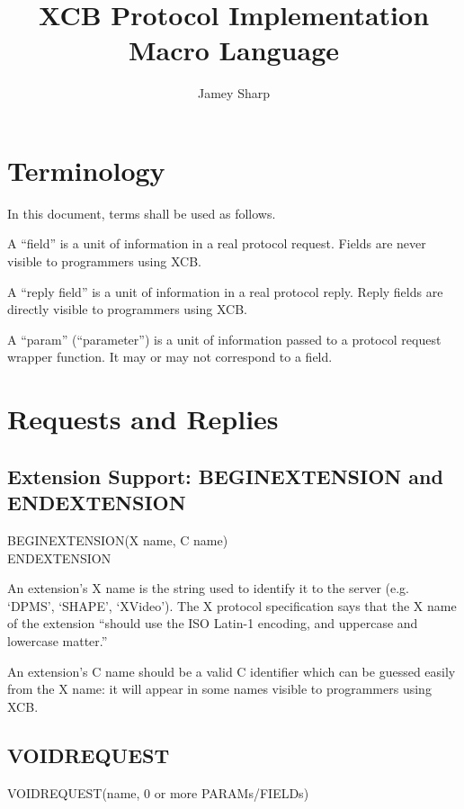 \documentclass[english]{article}
\begin{document}
\title{XCB Protocol Implementation Macro Language}


\author{Jamey Sharp}

\maketitle

\section{Terminology}

In this document, terms shall be used as follows.

A ``field'' is a unit of information in a real protocol request. Fields
are never visible to programmers using XCB.

A ``reply field'' is a unit of information in a real protocol reply.
Reply fields are directly visible to programmers using XCB.

A ``param'' (``parameter'') is a unit of information passed to a protocol
request wrapper function. It may or may not correspond to a field.


\section{Requests and Replies}


\subsection{Extension Support: BEGINEXTENSION and ENDEXTENSION}

BEGINEXTENSION(X name, C name)\\
ENDEXTENSION

An extension's X name is the string used to identify it to the server
(e.g. `DPMS', `SHAPE', `XVideo'). The X protocol specification says that
the X name of the extension ``should use the ISO Latin-1 encoding, and
uppercase and lowercase matter.''

An extension's C name should be a valid C identifier which can be guessed
easily from the X name: it will appear in some names visible to
programmers using XCB.


\subsection{VOIDREQUEST}

VOIDREQUEST(name, 0 or more PARAMs/FIELDs)
\end{document}
